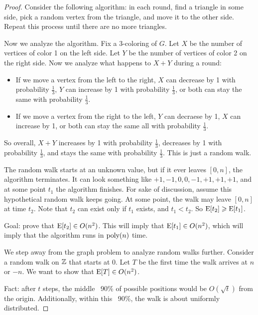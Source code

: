 \documentclass{report}
\begin{document}
\begin{proof}
    Consider the following algorithm: in each round, find a triangle in some side, pick a random vertex from the triangle, and move it to the other side. Repeat this process until there are no more triangles.

Now we analyze the algorithm. Fix a 3-coloring of $G$. Let $X$ be the number of vertices of color 1 on the left side. Let $Y$ be the number of vertices of color 2 on the right side. Now we analyze what happens to $X+Y$ during a round: 
\begin{itemize}
    \item If we move a vertex from the left to the right, $X$ can decrease by 1 with probability $\frac 13$, $Y$ can increase by 1 with probability $\frac 13$, or both can stay the same with probability $\frac 13$. 
    \item If we move a vertex from the right to the left, $Y$ can decraese by 1, $X$ can increase by 1, or both can stay the same all with probability $\frac 13$.
\end{itemize}
So overall, $X+Y$ increases by 1 with probability $\frac 13$, decreases by 1 with probability $\frac 13$, and stays the same with probability $\frac 13$. This is just a random walk.

The random walk starts at an unknown value, but if it ever leaves $[0, n]$, the algorithm terminates. It can look something like $+1, -1, 0, 0, -1, +1, +1, +1$, and at some point $t_1$ the algorithm finishes. For sake of discussion, assume this hypothetical random walk keeps going. At some point, the walk may leave $[0, n]$ at time $t_2$. Note that $t_2$ can exist only if $t_1$ exists, and $t_1 < t_2$. So $\operatorname{E}[t_2] \geqslant \operatorname{E}[t_1]$.

Goal: prove that $\operatorname{E}[t_2] \in O(n^2)$. This will imply that $\operatorname{E}[t_1] \in O(n^2)$, which will imply that the algorithm runs in $\text{poly}(n)$ time.

We step away from the graph problem to analyze random walks further. Consider a random walk on $\mathbb{Z}$ that starts at 0. Let $T$ be the first time the walk arrives at $n$ or $-n$. We want to show that $\operatorname{E}[T] \in O(n^2)$.

Fact: after $t$ steps, the middle ~90\% of possible positions would be $O(\sqrt t)$ from the origin. Additionally, within this ~90\%, the walk is about uniformly distributed.


\end{proof}
\end{document}
